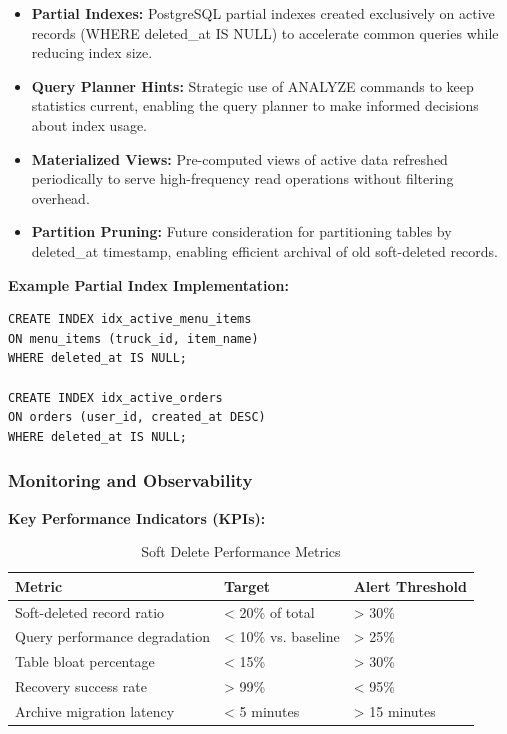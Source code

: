 \documentclass[12pt,a4paper]{article}
\begin{document}
\begin{tcolorbox}[colback=primaryblue!5, colframe=primaryblue, boxrule=1pt, arc=3pt, left=10pt, right=10pt, top=8pt, bottom=8pt]
\begin{itemize}[leftmargin=2em, itemsep=6pt]
    \item \textbf{Partial Indexes:} PostgreSQL partial indexes created exclusively on active records (WHERE deleted\_at IS NULL) to accelerate common queries while reducing index size.
    \item \textbf{Query Planner Hints:} Strategic use of ANALYZE commands to keep statistics current, enabling the query planner to make informed decisions about index usage.
    \item \textbf{Materialized Views:} Pre-computed views of active data refreshed periodically to serve high-frequency read operations without filtering overhead.
    \item \textbf{Partition Pruning:} Future consideration for partitioning tables by deleted\_at timestamp, enabling efficient archival of old soft-deleted records.
\end{itemize}

\vspace{0.5em}

\textbf{Example Partial Index Implementation:}

\begin{verbatim}
CREATE INDEX idx_active_menu_items 
ON menu_items (truck_id, item_name) 
WHERE deleted_at IS NULL;

CREATE INDEX idx_active_orders 
ON orders (user_id, created_at DESC) 
WHERE deleted_at IS NULL;
\end{verbatim}

\subsubsection{Monitoring and Observability}

\textbf{Key Performance Indicators (KPIs):}

\begin{table}[H]
\centering
\begin{tabular}{|p{5cm}|p{4cm}|p{4cm}|}
\hline
\textbf{Metric} & \textbf{Target} & \textbf{Alert Threshold} \\
\hline
Soft-deleted record ratio & < 20\% of total & > 30\% \\
\hline
Query performance degradation & < 10\% vs. baseline & > 25\% \\
\hline
Table bloat percentage & < 15\% & > 30\% \\
\hline
Recovery success rate & > 99\% & < 95\% \\
\hline
Archive migration latency & < 5 minutes & > 15 minutes \\
\hline
\end{tabular}
\caption{Soft Delete Performance Metrics}
\end{table}


\end{tcolorbox}
\end{document}
